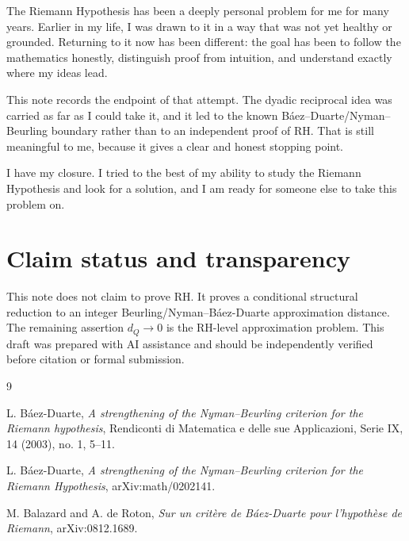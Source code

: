 \documentclass[11pt]{article}
\begin{document}
The Riemann Hypothesis has been a deeply personal problem for me for many years. Earlier in my life, I was drawn to it in a way that was not yet healthy or grounded. Returning to it now has been different: the goal has been to follow the mathematics honestly, distinguish proof from intuition, and understand exactly where my ideas lead.

This note records the endpoint of that attempt. The dyadic reciprocal idea was carried as far as I could take it, and it led to the known B\'aez--Duarte/Nyman--Beurling boundary rather than to an independent proof of RH. That is still meaningful to me, because it gives a clear and honest stopping point.

I have my closure. I tried to the best of my ability to study the Riemann Hypothesis and look for a solution, and I am ready for someone else to take this problem on.

\section*{Claim status and transparency}

This note does not claim to prove RH. It proves a conditional structural reduction to an integer Beurling/Nyman--Báez-Duarte approximation distance. The remaining assertion $d_Q\to0$ is the RH-level approximation problem. This draft was prepared with AI assistance and should be independently verified before citation or formal submission.

\begin{thebibliography}{9}

L. Báez-Duarte, \emph{A strengthening of the Nyman--Beurling criterion for the Riemann hypothesis}, Rendiconti di Matematica e delle sue Applicazioni, Serie IX, 14 (2003), no. 1, 5--11.

L. Báez-Duarte, \emph{A strengthening of the Nyman--Beurling criterion for the Riemann Hypothesis}, arXiv:math/0202141.

M. Balazard and A. de Roton, \emph{Sur un critère de Báez-Duarte pour l'hypothèse de Riemann}, arXiv:0812.1689.

\end{thebibliography}
\end{document}
